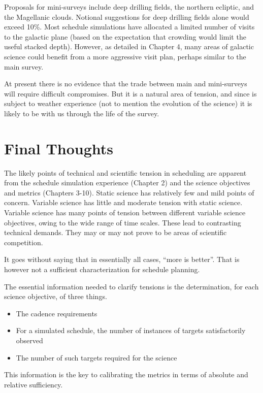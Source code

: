 Proposals for mini-surveys include deep drilling fields, the northern
ecliptic, and the Magellanic clouds. Notional suggestions for deep
drilling fields alone would exceed 10\%.   Most schedule simulations
have allocated a limited number of visits to the galactic plane (based
on the expectation that crowding would limit the useful stacked depth).
However, as detailed in Chapter 4, many areas of galactic science could
benefit from a more aggressive visit plan, perhaps similar to the main
survey.

At present there is no evidence that the trade between main and
mini-surveys will require difficult compromises.  But it is a natural
area of tension, and since is subject to weather experience (not to
mention the evolution of the science) it is likely to be with us through
the life of the survey.


\section{Final Thoughts}

The likely points of technical and scientific tension in scheduling are
apparent from the schedule simulation experience (Chapter 2) and the
science objectives and metrics (Chapters 3-10).  Static science has
relatively few and mild points of concern.  Variable science has little
and moderate tension with static science.  Variable science has many
points of tension between different variable science objectives, owing
to the wide range of time scales. These lead to contrasting technical
demands.  They may or may not prove to be areas of scientific
competition.

It goes without saying that in essentially all cases, ``more is
better''.  That is however not a sufficient characterization for
schedule planning.

The essential information needed to clarify tensions is the
determination, for each science objective, of three things.
\begin{itemize}
	\item The cadence requirements
	\item For a simulated schedule, the number of instances of targets satisfactorily observed
	\item The number of such targets required for the science
\end{itemize}

This information is the key to calibrating the metrics in terms of
absolute and relative  sufficiency.

